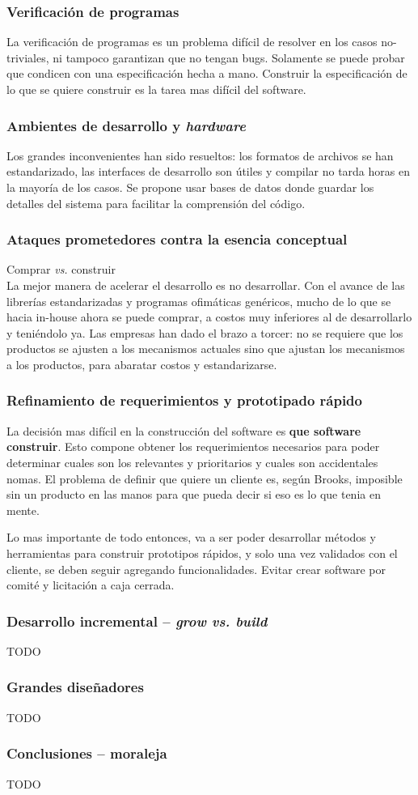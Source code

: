 \documentclass{beamer}
\begin{document}
\begin{frame}[fragile]
  \frametitle{Verificaci\'on de programas}
  La verificaci\'on de programas es un problema dif\'icil de resolver en los casos
  no-triviales, ni tampoco garantizan que no tengan bugs. Solamente se puede
  probar que condicen con una especificaci\'on hecha a mano. Construir la especificaci\'on
  de lo que se quiere construir es la tarea mas dif\'icil del software.
\end{frame}

\begin{frame}[fragile]
  \frametitle{Ambientes de desarrollo y \textit{hardware}}
  Los grandes inconvenientes han sido resueltos: los formatos de archivos se han
  estandarizado, las interfaces de desarrollo son \'utiles y compilar no tarda horas en
  la mayor\'ia de los casos. Se propone usar bases de datos donde guardar los detalles
  del sistema para facilitar la comprensi\'on del c\'odigo.
\end{frame}


\begin{frame}[fragile]
  \frametitle{Ataques prometedores contra la esencia conceptual}
  Comprar \textit{vs.} construir \\
  La mejor manera de acelerar el desarrollo es no desarrollar. Con el avance de las
  librer\'ias estandarizadas y programas ofim\'aticas gen\'ericos, mucho de lo que se hacia
  in-house ahora se puede comprar, a costos muy inferiores al de desarrollarlo y teni\'endolo
  ya. Las empresas han dado el brazo a torcer: no se requiere que los productos se ajusten a
  los mecanismos actuales sino que ajustan los mecanismos a los productos, para abaratar costos
  y estandarizarse.
\end{frame}


\begin{frame}[fragile]
  \frametitle{Refinamiento de requerimientos y prototipado r\'apido}
  La decisi\'on mas dif\'icil en la construcci\'on del software es \textbf{que software construir}. Esto
  compone obtener los requerimientos necesarios para poder determinar cuales son los relevantes y
  prioritarios y cuales son accidentales nomas. El problema de definir que quiere un cliente
  es, seg\'un Brooks, imposible sin un producto en las manos para que pueda decir si eso es lo
  que tenia en mente.

  Lo mas importante de todo entonces, va a ser poder desarrollar m\'etodos y herramientas para
  construir prototipos r\'apidos, y solo una vez validados con el cliente, se deben seguir
  agregando funcionalidades. Evitar crear software por comit\'e y licitaci\'on a caja cerrada.
\end{frame}


\begin{frame}[fragile]
  \frametitle{Desarrollo incremental -- \textit{grow vs. build}}
  TODO
\end{frame}

\begin{frame}[fragile]
  \frametitle{Grandes dise\~nadores}
  TODO
\end{frame}

\begin{frame}[fragile]
  \frametitle{Conclusiones -- moraleja}
  TODO
\end{frame}
\end{document}
